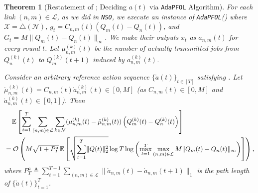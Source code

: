 \documentclass[11pt,fullpage,letterpaper]{article} %
\newtheorem{theorem}{Theorem}[section]
\renewcommand{\bm}[1]{#1}%
\renewcommand{\O}{\operatorname{\mathcal O}}
\newcommand{\E}{\operatornamewithlimits{\mathbb{E}}}
\newcommand{\mN}{{\mathcal N}}
\newcommand{\mL}{{\mathcal L}}
\newcommand{\SSAlg}{\texttt{NSO}\xspace}
\newcommand{\OLOAlg}{\texttt{AdaPFOL}\xspace}
\begin{document}
\begin{theorem}[Restatement of ; Deciding $\bm a(t)$ via \OLOAlg Algorithm]
For each link $(n,m)\in \mL$, as we did in \SSAlg, we execute an instance of \OLOAlg () where $\mathcal X=\triangle(\mN)$, $\bm g_t=C_{n,m}(t) (\bm Q_m(t) - \bm Q_n(t))$, and $G_t=M\lVert \bm Q_m(t)-\bm Q_n(t)\rVert_\infty$. We make their outputs $\bm x_t$ as $\bm a_{n,m}(t)$ for every round $t$. Let $\mu_{n,m}^{(k)}(t)$ be the number of actually transmitted jobs from $Q_n^{(k)}(t)$ to $Q_m^{(k)}(t+1)$ induced by $a_{n,m}^{(k)}(t)$.

Consider an arbitrary reference action sequence $\{\mathring{\bm a} (t)\}_{t\in [T]}$ satisfying . Let $\mathring{\mu}_{n,m}^{(k)} (t)=C_{n,m}(t) \mathring{a}_{n,m}^{(k)} (t)\in [0,M]$ (as $C_{n,m}(t)\in [0,M]$ and $\mathring a_{n,m}^{(k)}(t)\in [0,1]$). Then
\begin{align*}
&\quad \E\left [\sum_{t=1}^T \sum_{(n,m)\in \mL} \sum_{k\in \mN} (\mu_{n,m}^{(k)}(t)-\mathring{\mu}_{n,m}^{(k)}(t))\left (Q_m^{(k)}(t)-Q_n^{(k)}(t)\right )\right ]\\
&=\O\left (M\sqrt{1+P_T^a} \E\left [\sqrt{\sum_{t=1}^T \lVert \bm Q(t)\rVert_2^2} \log T \log \left (\max_{t=1}^T \max_{(n,m)\in \mL} M \lVert \bm Q_m(t) - \bm Q_n(t)\rVert_\infty\right )\right ]\right )\text{,}
\end{align*}
where $P_T^a\triangleq \sum_{t=1}^{T-1} \sum_{(n,m)\in \mL} \lVert \mathring{\bm a}_{n,m}(t) - \mathring{\bm a}_{n,m}(t+1)\rVert_1$ is the path length of $\{\mathring{\bm a}(t)\}_{t=1}^T$.
\end{theorem}
\end{document}
